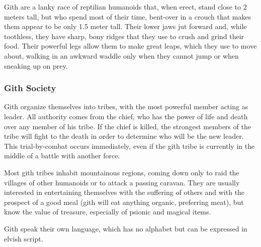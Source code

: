Gith are a lanky race of reptilian humanoids that, when erect, stand close to 2 meters tall, but who spend most of their time, bent-over in a crouch that makes them appear to be only 1.5 meter tall. Their lower jaws jut forward and, while toothless, they have sharp, bony ridges that they use to crush and grind their food. Their powerful legs allow them to make great leaps, which they use to move about, walking in an awkward waddle only when they cannot jump or when sneaking up on prey.

\subsubsection{Gith Society}
Gith organize themselves into tribes, with the most powerful member acting as leader. All authority comes from the chief, who has the power of life and death over any member of his tribe. If the chief is killed, the strongest members of the tribe will fight to the death in order to determine who will be the new leader. This trial-by-combat occurs immediately, even if the gith tribe is currently in the middle of a battle with another force.

Most gith tribes inhabit mountainous regions, coming down only to raid the villages of other humanoids or to attack a passing caravan. They are usually interested in entertaining themselves with the suffering of others and with the prospect of a good meal (gith will eat anything organic, preferring meat), but know the value of treasure, especially of psionic and magical items.

Gith speak their own language, which has no alphabet but can be expressed in elvish script.

